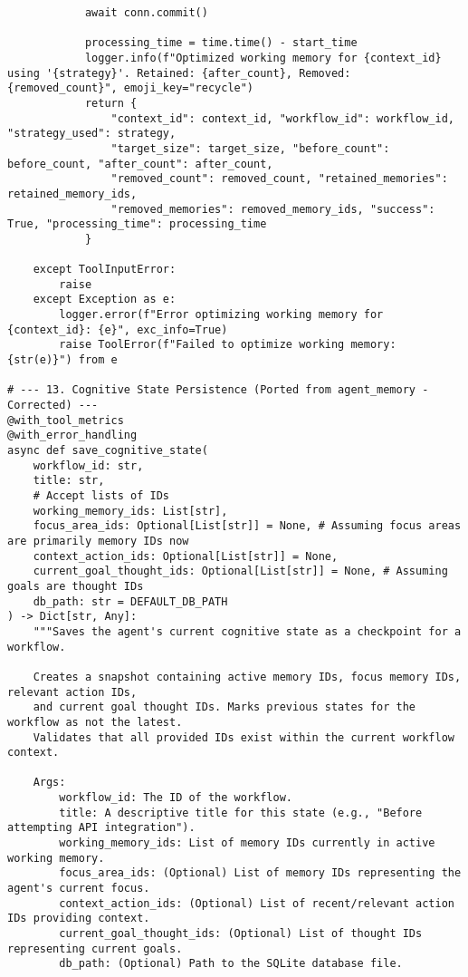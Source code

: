 \documentclass[12pt,a4paper]{article}
\begin{document}
\begin{pageablecode}
\begin{verbatim}
            await conn.commit()

            processing_time = time.time() - start_time
            logger.info(f"Optimized working memory for {context_id} using '{strategy}'. Retained: {after_count}, Removed: {removed_count}", emoji_key="recycle")
            return {
                "context_id": context_id, "workflow_id": workflow_id, "strategy_used": strategy,
                "target_size": target_size, "before_count": before_count, "after_count": after_count,
                "removed_count": removed_count, "retained_memories": retained_memory_ids,
                "removed_memories": removed_memory_ids, "success": True, "processing_time": processing_time
            }

    except ToolInputError:
        raise
    except Exception as e:
        logger.error(f"Error optimizing working memory for {context_id}: {e}", exc_info=True)
        raise ToolError(f"Failed to optimize working memory: {str(e)}") from e

# --- 13. Cognitive State Persistence (Ported from agent_memory - Corrected) ---
@with_tool_metrics
@with_error_handling
async def save_cognitive_state(
    workflow_id: str,
    title: str,
    # Accept lists of IDs
    working_memory_ids: List[str],
    focus_area_ids: Optional[List[str]] = None, # Assuming focus areas are primarily memory IDs now
    context_action_ids: Optional[List[str]] = None,
    current_goal_thought_ids: Optional[List[str]] = None, # Assuming goals are thought IDs
    db_path: str = DEFAULT_DB_PATH
) -> Dict[str, Any]:
    """Saves the agent's current cognitive state as a checkpoint for a workflow.

    Creates a snapshot containing active memory IDs, focus memory IDs, relevant action IDs,
    and current goal thought IDs. Marks previous states for the workflow as not the latest.
    Validates that all provided IDs exist within the current workflow context.

    Args:
        workflow_id: The ID of the workflow.
        title: A descriptive title for this state (e.g., "Before attempting API integration").
        working_memory_ids: List of memory IDs currently in active working memory.
        focus_area_ids: (Optional) List of memory IDs representing the agent's current focus.
        context_action_ids: (Optional) List of recent/relevant action IDs providing context.
        current_goal_thought_ids: (Optional) List of thought IDs representing current goals.
        db_path: (Optional) Path to the SQLite database file.


\end{verbatim}
\end{pageablecode}
\end{document}
